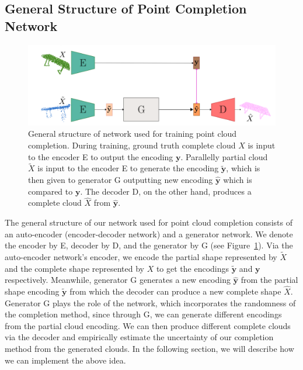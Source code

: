     \subsection{General Structure of Point Completion Network}
    \begin{figure}[htb]
      \begin{center}
      \includegraphics[width=\linewidth]{figures/general_network.png}
      \end{center}
      \caption{General structure of network used for training point cloud completion. During training, ground truth complete cloud $X$ is input to the encoder E to output the encoding $\mathbf{y}$. Parallelly partial cloud $\tilde{X}$ is input to the encoder E to generate the encoding $\mathbf{\tilde{y}}$, which is then given to generator G outputting new encoding $\mathbf{\hat{y}}$ which is compared to $\mathbf{y}$. The decoder D, on the other hand, produces a complete cloud $\hat{X}$ from  $\mathbf{\hat{y}}$.}\label{fig:gen_net}
    \end{figure}
    The general structure of our network used for point cloud completion consists of an auto-encoder (encoder-decoder network) and a generator network. We denote the encoder by E, decoder by D, and the generator by G (see Figure~\ref{fig:gen_net}). Via the auto-encoder network's encoder, we encode the partial shape represented by $\tilde{X}$ and the complete shape represented by $X$ to get the encodings $\mathbf{\tilde{y}}$ and $\mathbf{y}$ respectively. Meanwhile, generator G generates a new encoding $\mathbf{\hat{y}}$ from the partial shape encoding $\mathbf{\tilde{y}}$ from which the decoder can produce a new complete shape $\hat{X}$. Generator G plays the role of the network, which incorporates the randomness of the completion method, since through G, we can generate different encodings from the partial cloud encoding. We can then produce different complete clouds via the decoder and empirically estimate the uncertainty of our completion method from the generated clouds. In the following section, we will describe how we can implement the above idea.

